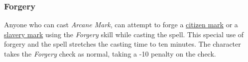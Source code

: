 \subsubsection{Forgery}

Anyone who can cast \emph{Arcane Mark}, can attempt to forge a
\hyperref[sec:Citizen Mark]{citizen mark} or a
\hyperref[sec:Slavery Mark]{slavery mark} using the \emph{Forgery}
skill while casting the spell. This special use of forgery and
the spell stretches the casting time to ten minutes. The character
takes the \emph{Forgery} check as normal, taking a -10 penalty on
the check.

\FloatBarrier

